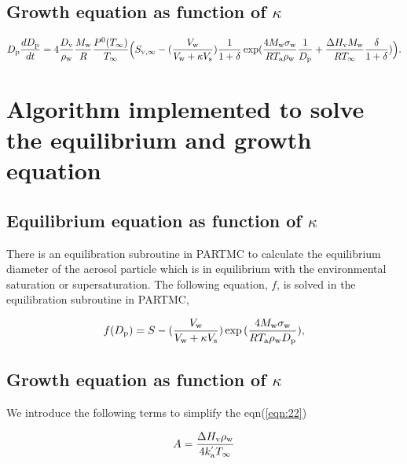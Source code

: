 \documentclass[12pt]{article}
\begin{document}
\subsection{Growth equation as function of $\kappa$ }

\begin{equation}\label{eqn:22}
D_{\rm p}\frac{dD_{\rm p}}{dt}=4 \frac{D_{\rm v}} {\rho_{\rm w}} \frac{M_{\rm w}}{R} \frac{P^{\rm 0}(T_{\infty})} {T_{\infty}} \Big(S_{\rm v, \infty} -  (\frac{V_{\rm w}}{V_{\rm w} + \kappa V_{\rm s}}) \frac{1}{1+\delta} \exp(\frac{4 M_{\rm w}\sigma_{\rm w}}{R T_{\rm a} \rho_{\rm w}}\frac{1}{D_{\rm p}}+\frac{\Delta H_{\rm v} M_{\rm w}}{R T_{\infty}} \frac{\delta}{1+\delta})\Big).
\end{equation}


\section{Algorithm implemented to solve the equilibrium and growth equation}

\subsection{Equilibrium equation as function of $\kappa$}

There is an equilibration subroutine in PARTMC to calculate the equilibrium diameter of the aerosol particle which is in equilibrium with the environmental saturation or supersaturation.
The following equation, $f$, is solved in the equilibration subroutine in PARTMC,


\begin{equation}\label{eqn:19a}
f(D_{\rm p})=S-(\frac{V_{\rm w}}{V_{\rm w} + \kappa V_{\rm s}})   \exp{(\frac{4 M_{\rm w} \sigma_{\rm w}}{R T_{\rm a} \rho_{\rm w} D_{\rm p}})},
\end{equation}


\subsection{Growth equation as function of $\kappa$}

We introduce the following terms to simplify the eqn(\ref{eqn:22})

\begin{equation}
A=\frac{\Delta H_{\rm v} \rho_{\rm w}}{4 k_{\rm a}^{'} T_{\infty}}
\end{equation}
\end{document}
